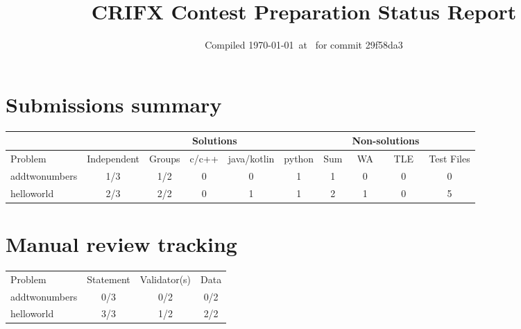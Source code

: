\documentclass{article}%
\title{CRIFX Contest Preparation Status Report}%
\date{Compiled \today~at \DTMcurrenttime\DTMcurrentzone~for commit 29f58da3}%
\begin{document}
%
\normalsize%
\maketitle%
\section{Submissions summary}%
\label{sec:Submissionssummary}%
\begin{tabular}{|l|c|c|c|c|c|c|c|c|c|}%
\hline%
\rowcolor{cyan}%
&\multicolumn{6}{c}{{\tiny Solutions}}&\multicolumn{2}{|c|}{{\tiny Non-solutions}}&\\%
\hline%
\rowcolor{cyan}%
{\tiny Problem}&{\tiny Independent}&{\tiny Groups}&{\tiny c/c++}&{\tiny java/kotlin}&{\tiny python}&{\tiny Sum}&{\tiny WA}&{\tiny TLE}&{\tiny Test Files}\\%
\hline%
addtwonumbers&\cellcolor{red}1/3&\cellcolor{red}1/2&0&0&1&1&0&0&0\\%
\hline%
helloworld&\cellcolor{red}2/3&\cellcolor{green}2/2&0&1&1&2&1&0&5\\%
\hline%
\end{tabular}

%
\section{Manual review tracking}%
\label{sec:Manualreviewtracking}%
\begin{tabular}{|l|c|c|c|}%
\hline%
\rowcolor{cyan}%
{\tiny Problem}&{\tiny Statement}&{\tiny Validator(s)}&{\tiny Data}\\%
addtwonumbers&\cellcolor{red}0/3&\cellcolor{red}0/2&\cellcolor{red}0/2\\%
\hline%
helloworld&\cellcolor{green}3/3&\cellcolor{red}1/2&\cellcolor{green}2/2\\%
\hline%
\end{tabular}

%
\end{document}
